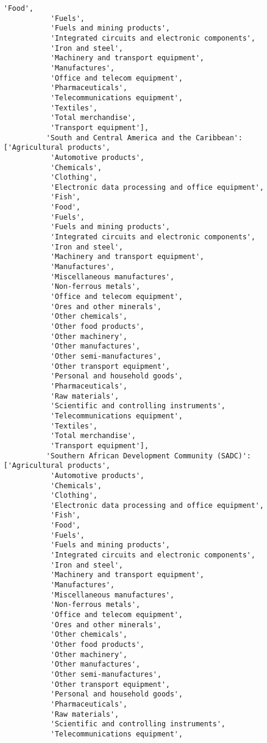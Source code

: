 \documentclass[11pt]{article}
\begin{document}
\begin{Verbatim}[commandchars=\\\{\}]
           'Food',
           'Fuels',
           'Fuels and mining products',
           'Integrated circuits and electronic components',
           'Iron and steel',
           'Machinery and transport equipment',
           'Manufactures',
           'Office and telecom equipment',
           'Pharmaceuticals',
           'Telecommunications equipment',
           'Textiles',
           'Total merchandise',
           'Transport equipment'],
          'South and Central America and the Caribbean': ['Agricultural products',
           'Automotive products',
           'Chemicals',
           'Clothing',
           'Electronic data processing and office equipment',
           'Fish',
           'Food',
           'Fuels',
           'Fuels and mining products',
           'Integrated circuits and electronic components',
           'Iron and steel',
           'Machinery and transport equipment',
           'Manufactures',
           'Miscellaneous manufactures',
           'Non-ferrous metals',
           'Office and telecom equipment',
           'Ores and other minerals',
           'Other chemicals',
           'Other food products',
           'Other machinery',
           'Other manufactures',
           'Other semi-manufactures',
           'Other transport equipment',
           'Personal and household goods',
           'Pharmaceuticals',
           'Raw materials',
           'Scientific and controlling instruments',
           'Telecommunications equipment',
           'Textiles',
           'Total merchandise',
           'Transport equipment'],
          'Southern African Development Community (SADC)': ['Agricultural products',
           'Automotive products',
           'Chemicals',
           'Clothing',
           'Electronic data processing and office equipment',
           'Fish',
           'Food',
           'Fuels',
           'Fuels and mining products',
           'Integrated circuits and electronic components',
           'Iron and steel',
           'Machinery and transport equipment',
           'Manufactures',
           'Miscellaneous manufactures',
           'Non-ferrous metals',
           'Office and telecom equipment',
           'Ores and other minerals',
           'Other chemicals',
           'Other food products',
           'Other machinery',
           'Other manufactures',
           'Other semi-manufactures',
           'Other transport equipment',
           'Personal and household goods',
           'Pharmaceuticals',
           'Raw materials',
           'Scientific and controlling instruments',
           'Telecommunications equipment',

\end{Verbatim}
\end{document}
